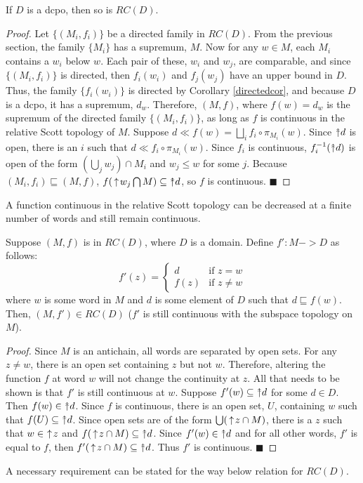 \begin{proposition}
If $D$ is a dcpo, then so is $RC(D)$.
\end{proposition}
\begin{proof}
Let $\{(M_i, f_i)\}$ be a directed family in $RC(D)$.  From the previous section, the family $\{M_i\}$ has a supremum, $M$.  Now for any $w\in M$, each $M_i$ contains a $w_i$ below $w$.  Each pair of these, $w_i$ and $w_j$, are comparable, and since $\{(M_i, f_i)\}$ is directed, then $f_i(w_i)$ and $f_j(w_j)$ have an upper bound in $D$.  Thus, the family $\{f_i(w_i)\}$ is directed by Corollary \ref{directedcor}, and because $D$ is a dcpo, it has a supremum, $d_w$.  Therefore, $(M,f)$, where $f(w) = d_w$ is the supremum of the directed family $\{(M_i, f_i)\}$, as long as $f$ is continuous in the relative Scott topology of $M$.  Suppose $d \ll f(w) = \bigsqcup_{i} f_i\circ \pi_{M_i}(w)$.  Since $\Ua d$ is open, there is an $i$ such that $d \ll f_i\circ \pi_{M_i}(w)$.  Since $f_i$ is continuous, $f_i^{-1}(\Ua d)$ is open of the form $(\bigcup_{j} w_j) \cap M_i$ and $w_j\leq w$ for some $j$.  Because $(M_i,f_i)\sqsubseteq (M,f)$, $f(\ua w_j \bigcap M) \subseteq \Ua d$, so $f$ is continuous.
\hfill $\blacksquare$
\end{proof}

A function continuous in the relative Scott topology can be decreased at a finite number of words and still remain continuous.

\begin{lemma}
Suppose $(M,f)$ is in $RC(D)$, where $D$ is a domain.  Define $f':M->D$ as follows:
\[
	f'(z) = \begin{cases}
			d & \text{if } z=w \\
			f(z) & \text{if } z\neq w
	\end{cases}
\]
where $w$ is some word in $M$ and $d$ is some element of $D$ such that $d \sqsubseteq f(w)$.  Then, $(M,f') \in RC(D)$ ($f'$ is still continuous with the subspace topology on $M$).
\end{lemma}
\begin{proof}
Since $M$ is an antichain, all words are separated by open sets.  For any $z\neq w$, there is an open set containing $z$ but not $w$.  Therefore, altering the function $f$ at word $w$ will not change the continuity at $z$.  All that needs to be shown is that $f'$ is still continuous at $w$.  Suppose $f'(w) \subseteq \Ua d$ for some $d\in D$.  Then $f(w) \in \Ua d$.  Since $f$ is continuous, there is an open set, $U$, containing $w$ such that $f(U) \subseteq \Ua d$.  Since open sets are of the form $\bigcup (\,\uparrow\! z \cap M)$, there is a $z$ such that $w\in\, \,\uparrow\! z$ and $f(\ua z \cap M) \subseteq \Ua d$.  Since $f'(w) \in \Ua d$ and for all other words, $f'$ is equal to $f$, then $f'(\ua z\cap M) \subseteq \Ua d$.  Thus $f'$ is continuous. 
\hfill $\blacksquare$
\end{proof}
A necessary requirement can be stated for the way below relation for $RC(D)$.

